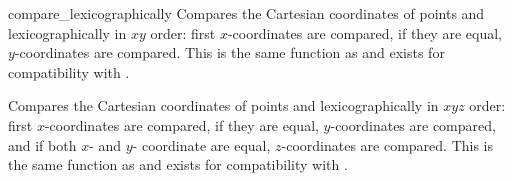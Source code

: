 \begin{ccRefFunction}{compare_lexicographically}
      {Compares the Cartesian coordinates of points  and
        lexicographically in $xy$ order: first 
       $x$-coordinates are compared, if they are equal, $y$-coordinates
       are compared. This is the same function as  and exists for compatibility with .}

      {Compares the Cartesian coordinates of points  and
        lexicographically in $xyz$ order: first 
       $x$-coordinates are compared, if they are equal, $y$-coordinates
       are compared, and if both $x$- and $y$- coordinate are equal,
       $z$-coordinates are compared. This is the same function as  and exists for compatibility with .}


\end{ccRefFunction}

